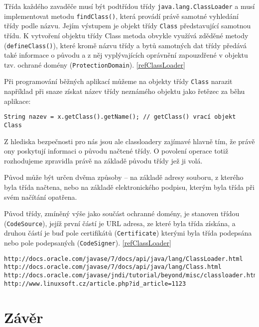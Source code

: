 Třída každého zavaděče musí být podtřídou třídy {\tt java.lang.ClassLoader} a musí implementovat metodu {\tt findClass()}, která provádí právě samotné vyhledání třídy podle názvu. Jejím výstupem je objekt třídy {\tt Class} představující samotnou třídu. K vytvoření objektu třídy Class metoda obvykle využívá zděděné metody ({\tt defineClass()}), které kromě názvu třídy a bytů samotných dat třídy předává také informace o původu a z něj vyplývajících oprávnění zapouzdřené v objektu tzv. ochrané domény ({\tt ProtectionDomain}). \ref{refClassLoader}

Při programování běžných aplikací můžeme na objekty třídy {\tt Class} narazit například při snaze získat název třídy neznámého objektu jako řetězec za běhu aplikace:

\begin{verbatim}
String nazev = x.getClass().getName(); // getClass() vrací objekt Class
\end{verbatim}

Z hlediska bezpečnosti pro nás jsou ale classloadery zajímavé hlavně tím, že právě ony poskytují informaci o původu načtené třídy. O povolení operace totiž rozhodujeme zpravidla právě na základě původu třídy jež ji volá.

Původ může být určen dvěma způsoby -- na základě adresy souboru, z kterého byla třída načtena, nebo na základě elektronického podpisu, kterým byla třída při svém načítání opatřena.

Původ třídy, zmíněný výše jako součást ochranné domény, je stanoven třídou ({\tt CodeSource}), jejíž první částí je URL adresa, ze které byla třída získána, a druhou částí je buď pole certifikátů ({\tt Certificate}) kterými byla třída podepsána nebo pole podepsaných ({\tt CodeSigner}). \ref{refClassLoader}





\begin{verbatim}
http://docs.oracle.com/javase/7/docs/api/java/lang/ClassLoader.html
http://docs.oracle.com/javase/7/docs/api/java/lang/Class.html
http://docs.oracle.com/javase/jndi/tutorial/beyond/misc/classloader.html
http://www.linuxsoft.cz/article.php?id_article=1123
\end{verbatim}












\chapter{Závěr}

